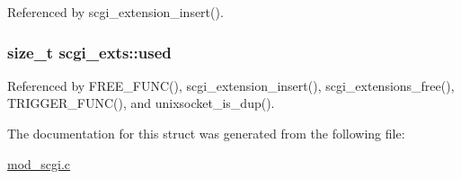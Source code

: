 Referenced by scgi\-\_\-extension\-\_\-insert().

\hypertarget{structscgi__exts_a8ebe86ef35baec5e131f261933042cb9}{
\subsubsection[{used}]{\setlength{\rightskip}{0pt plus 5cm}size\-\_\-t scgi\-\_\-exts\-::used}}\label{structscgi__exts_a8ebe86ef35baec5e131f261933042cb9}


Referenced by F\-R\-E\-E\-\_\-\-F\-U\-N\-C(), scgi\-\_\-extension\-\_\-insert(), scgi\-\_\-extensions\-\_\-free(), T\-R\-I\-G\-G\-E\-R\-\_\-\-F\-U\-N\-C(), and unixsocket\-\_\-is\-\_\-dup().



The documentation for this struct was generated from the following file\-:\begin{DoxyCompactItemize}
\item 
\hyperlink{mod__scgi_8c}{mod\-\_\-scgi.\-c}\end{DoxyCompactItemize}
